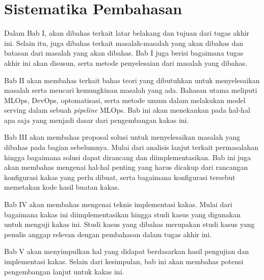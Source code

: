 \section{Sistematika Pembahasan}

Dalam Bab I, akan dibahas terkait latar belakang dan tujuan dari tugas akhir ini.
Selain itu, juga dibahas terkait masalah-masalah yang akan dibahas dan batasan dari masalah yang akan dibahas.
Bab I juga berisi bagaimana tugas akhir ini akan disusun, serta metode penyelesaian dari masalah yang dibahas.

Bab II akan membahas terkait bahas teori yang dibutuhkan untuk menyelesaikan masalah serta mencari kemungkinan masalah yang ada.
Bahasan utama meliputi MLOps, DevOps, optomatisasi, serta metode umum dalam melakukan model serving dalam sebuah \textit{pipeline} MLOps.
Bab ini akan menekankan pada hal-hal apa saja yang menjadi dasar dari pengembangan kakas ini.

Bab III akan membahas proposal solusi untuk menyelesaikan masalah yang dibahas pada bagian sebelumnya.
Mulai dari analisis lanjut terkait permasalahan hingga bagaimana solusi dapat dirancang dan diimplementasikan.
Bab ini juga akan membahas mengenai hal-hal penting yang harus dicakup dari rancangan konfigurasi kakas yang perlu dibuat, serta bagaimana konfigurasi tersebut memetakan kode hasil buatan kakas.

Bab IV akan membahas mengenai teknis implementasi kakas.
Mulai dari bagaimana kakas ini diimplementasikan hingga studi kasus yang digunakan untuk menguji kakas ini.
Studi kasus yang dibahas merupakan studi kasus yang penulis anggap relevan dengan pembahasan dalam tugas akhir ini.

Bab V akan menyimpulkan hal yang didapat berdasarkan hasil pengujian dan implementasi kakas.
Selain dari kesimpulan, bab ini akan membahas potensi pengembangan lanjut untuk kakas ini.
